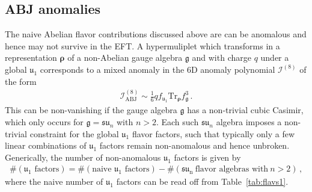 \documentclass[11pt]{article}
\numberwithin{equation}{section}
\newcommand{\fu}{\mathfrak{u}}
\newcommand{\fsu}{\mathfrak{su}}
\newcommand{\fg}{\mathfrak{g}}
\begin{document}
\subsection{ABJ anomalies}
\label{sec:ABJAnomalies}
The naive Abelian flavor contributions discussed above are can be anomalous and hence may not survive in the EFT. A hypermuliplet which transforms in a representation $\boldsymbol{\rho}$ of a non-Abelian gauge algebra $\mathfrak{g}$ and with charge $q$ under a global $\fu_1$ corresponds to a mixed anomaly in the 6D anomaly polynomial $\mathcal{I}^{(8)}$ of the form
\begin{align}
\label{ABJf}
\mathcal{I}^{(8)}_{\text{ABJ}} \sim \frac{1}{6}qf_{\fu_1}\text{Tr}_{\boldsymbol{\rho}}f_{\fg}^{3}\,.
\end{align}
This can be non-vanishing if the gauge algebra $\fg$  has a non-trivial cubic Casimir, which only occurs for $\mathfrak{g}=\fsu_{n}$ with $n > 2$. Each such $\fsu_n$ algebra imposes a non-trivial constraint for the global $\fu_1$ flavor factors, such that typically only a few linear combinations of $\fu_1$ factors remain non-anomalous and hence unbroken. Generically, the number of non-anomalous $\fu_1$ factors is given by
\begin{align}
\label{condABJ}
\#(\text{$\fu_1$ factors})=\#(\text{naive $\fu_1$ factors}) - \#(\mathfrak{su}_{\text{n}}~\text{flavor algebras with}~n>2)\,,
\end{align}
where the naive number of $\fu_1$ factors can be read off from Table~\ref{tab:flavs1}.
\end{document}
